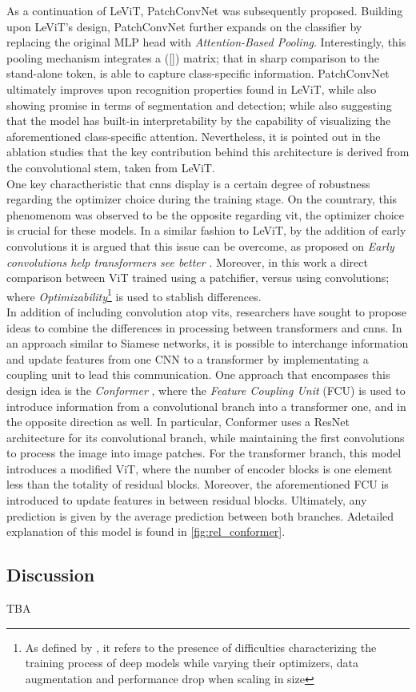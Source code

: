 As a continuation of LeViT, PatchConvNet \autocite{touvron2021augmenting} was subsequently 
proposed. Building upon LeViT's design, PatchConvNet further expands on the classifier by 
replacing the original MLP head with \emph{Attention-Based Pooling}. Interestingly, this 
pooling mechanism integrates a ([]) matrix; that in sharp comparison to the stand-alone 
token, is able to capture class-specific information. PatchConvNet ultimately improves upon 
recognition properties found in LeViT, while also showing promise in terms of segmentation and 
detection; while also suggesting that the model has built-in interpretability by the capability of 
visualizing the aforementioned class-specific attention. Nevertheless, it is pointed out in the 
ablation studies that the key contribution behind this architecture is derived from the 
convolutional stem, taken from LeViT.\\ 

\noindent One key charactheristic that \glspl{cnn} display is a certain degree of robustness 
regarding the optimizer choice during the training stage. On the countrary, this phenomenom was 
observed to be the opposite regarding \gls{vit}, the optimizer choice is crucial for these 
models. In a similar fashion to LeViT, by the addition of early convolutions it is argued that 
this issue can be overcome, as proposed on \emph{Early convolutions help transformers see 
better} \autocite{xiao2021early}. Moreover, in this work a direct comparison between ViT trained 
using a patchifier, versus using convolutions; where \emph{Optimizability}\footnote{As defined by 
\cite{xiao2021early}, it refers to the presence of difficulties characterizing the training 
process of deep models while varying their optimizers, data augmentation and performance drop 
when scaling in size} is used to stablish differences.\\



\noindent In addition of including convolution atop \glspl{vit}, researchers have sought to propose 
ideas to combine the differences in processing between transformers and \glspl{cnn}. In an 
approach similar to Siamese networks, it is possible to interchange information and update 
features from one CNN to a transformer by implementating a coupling unit to lead this 
communication. One approach that encompases this design idea is the \emph{Conformer} \autocite{
peng2021conformer}, where the \emph{Feature Coupling Unit} (FCU) is used to introduce information 
from a convolutional branch into a transformer one, and in the opposite direction as well. In 
particular, Conformer uses a ResNet architecture for its convolutional branch, while 
maintaining the first convolutions to process the image into image patches. For the transformer 
branch, this model introduces a modified ViT, where the number of encoder blocks is one element 
less than the totality of residual blocks. Moreover, the aforementioned FCU is introduced to update 
features in between residual blocks. Ultimately, any prediction is given by the average prediction 
between both branches. Adetailed explanation of this model is found in \autoref{fig:rel_conformer}.

\subsection{Discussion}
\label{{rel:discussion}}

TBA